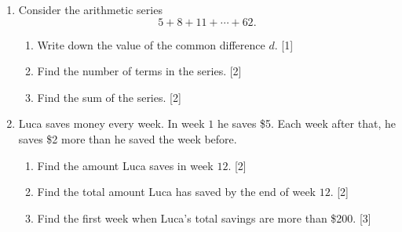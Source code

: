 \documentclass[12pt, twoside]{article}
\begin{document}
\begin{enumerate}[itemsep=0.15cm]

\newpage

\item[3.] [Maximum mark: 5]

Consider the arithmetic series
$$5 + 8 + 11 + \cdots + 62.$$

\begin{enumerate}[itemsep=0.1cm]
  \item Write down the value of the common difference $d$. \hfill [1]
  \item Find the number of terms in the series. \hfill [2]
  \item Find the sum of the series. \hfill [2]
\end{enumerate}


\newpage

\item[4.] [Maximum mark: 7]

Luca saves money every week. In week $1$ he saves \$5. Each week after
that, he saves \$2 more than he saved the week before.

\begin{enumerate}[itemsep=0.1cm]
  \item Find the amount Luca saves in week $12$. \hfill [2]
  \item Find the total amount Luca has saved by the end of week $12$.
  \hfill [2]
  \item Find the first week when Luca's total savings are more than
  \$200. \hfill [3]
\end{enumerate}



\end{enumerate}
\end{document}
